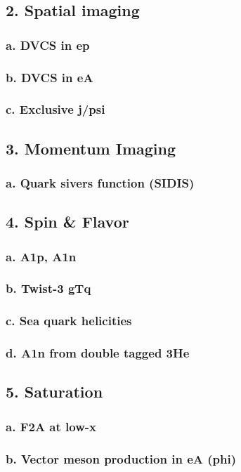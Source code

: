 \documentclass{report}
\begin{document}
\subsection{2. Spatial imaging}
\subsubsection{a. DVCS in ep}
\subsubsection{b. DVCS in eA}
\subsubsection{c. Exclusive j/psi}
\subsection{3. Momentum Imaging}
\subsubsection{a. Quark sivers function (SIDIS)}
\subsection{4. Spin & Flavor}
\subsubsection{a. A1p, A1n}
\subsubsection{b. Twist-3 gTq}
\subsubsection{c. Sea quark helicities}
\subsubsection{d. A1n from double tagged 3He}
\subsection{5. Saturation}
\subsubsection{a. F2A at low-x}
\subsubsection{b. Vector meson production in eA (phi)}
\end{document}
